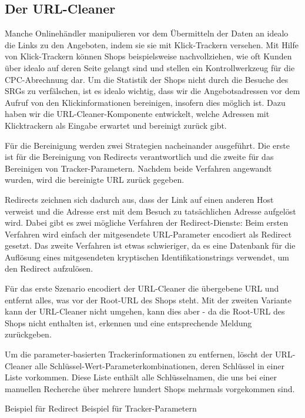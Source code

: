 \subsection{Der URL-Cleaner}
\label{subsec:urlcleaner}

Manche Onlinehändler manipulieren vor dem Übermitteln der Daten an idealo die Links zu den Angeboten, indem sie sie
mit Klick-Trackern versehen.
Mit Hilfe von Klick-Trackern können Shops beispielsweise nachvollziehen, wie oft Kunden über idealo auf deren Seite
gelangt sind und stellen ein Kontrollwerkzeug für die CPC-Abrechnung dar.
Um die Statistik der Shops nicht durch die Besuche des SRGs zu verfälschen, ist es idealo wichtig, dass wir die
Angebotsadressen vor dem Aufruf von den Klickinformationen bereinigen, insofern dies möglich ist.
Dazu haben wir die URL-Cleaner-Komponente entwickelt, welche Adressen mit Klicktrackern als Eingabe erwartet und
bereinigt zurück gibt.

Für die Bereinigung werden zwei Strategien nacheinander ausgeführt.
Die erste ist für die Bereinigung von Redirects verantwortlich und die zweite für das Bereinigen von Tracker-Parametern.
Nachdem beide Verfahren angewandt wurden, wird die bereinigte URL zurück gegeben.

Redirects zeichnen sich dadurch aus, dass der Link auf einen anderen Host verweist und die Adresse erst mit dem
Besuch zu tatsächlichen Adresse aufgelöst wird.
Dabei gibt es zwei mögliche Verfahren der Redirect-Dienste:
Beim ersten Verfahren wird einfach der mitgesendete URL-Parameter encodiert als Redirect gesetzt.
Das zweite Verfahren ist etwas schwieriger, da es eine Datenbank für die Auflösung eines mitgesendeten kryptischen
Identifikationstrings verwendet, um den Redirect aufzulösen.

Für das erste Szenario encodiert der URL-Cleaner die übergebene URL und entfernt alles, was vor der Root-URL des
Shops steht.
Mit der zweiten Variante kann der URL-Cleaner nicht umgehen, kann dies aber - da die Root-URL des Shops nicht
enthalten ist, erkennen und eine entsprechende Meldung zurückgeben.

Um die parameter-basierten Trackerinformationen zu entfernen, löscht der URL-Cleaner alle
Schlüssel-Wert-Parameterkombinationen, deren Schlüssel in einer Liste vorkommen.
Diese Liste enthält alle Schlüsselnamen, die uns bei einer manuellen Recherche über mehrere hundert Shops mehrmals
vorgekommen sind.

Beispiel für Redirect
Beispiel für Tracker-Parametern